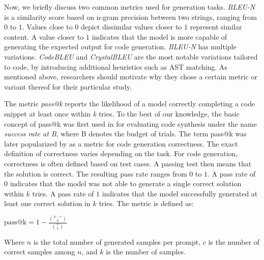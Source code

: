 Now, we briefly discuss two common metrics used for generation tasks.
\emph{BLEU-N} \cite{DBLP:conf/acl/PapineniRWZ02} is a similarity score based on n-gram precision between two strings, ranging from $0$ to $1$.
Values close to $0$ depict dissimilar values closer to $1$ represent similar content.
A value closer to $1$ indicates that the model is more capable of generating the expected output for code generation.
\emph{BLEU-N} has multiple variations.
\emph{CodeBLEU} \cite{DBLP:journals/corr/abs-2009-10297} and \emph{CrystalBLEU} \cite{DBLP:conf/kbse/EghbaliP22} are the most notable variations tailored to code, by introducing additional heuristics such as AST matching.
As mentioned above, researchers should motivate why they chose a certain metric or variant thereof for their particular study.

The metric \emph{pass@k} reports the likelihood of a model correctly completing a code snippet at least once within \emph{k} tries.
To the best of our knowledge, the basic concept of pass@k was first used in \cite{DBLP:journals/corr/abs-1906-04908} for evaluating code synthesis under the name \emph{success rate at B}, where B denotes the budget of trials.
The term pass@k was later popularized by \cite{DBLP:journals/corr/abs-2107-03374} as a metric for code generation correctness.
The exact definition of correctness varies depending on the task.
For code generation, correctness is often defined based on test cases. A passing test then means that the solution is correct.
The resulting pass rate ranges from $0$ to $1$.
A pass rate of $0$ indicates that the model was not able to generate a single correct solution within $k$ tries.
A pass rate of $1$ indicates that the model successfully generated at least one correct solution in $k$ tries.
The metric is defined as:

$\text{pass@k} = 1 - \frac{\binom{n-c}{k}}{\binom{n}{k}}$

Where $n$ is the total number of generated samples per prompt, $c$ is the number of correct samples among  $n$, and $k$ is the number of samples.


